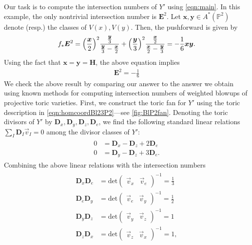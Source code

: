 \documentclass[11pt,oneside,english]{article}
\numberwithin{equation}{section}
\let\originalleft\left
\let\originalright\right
\renewcommand*{\left}{\mathopen{}\mathclose\bgroup\originalleft}
\renewcommand*{\right}{\aftergroup\egroup\originalright}
\theoremstyle{definition}
\begin{document}
Our task is to compute the intersection numbers of $Y'$ using \cref{eqn:main}. In this example, the only nontrivial intersection number is $\boldsymbol{E}^2$. Let $\boldsymbol{x}, \boldsymbol{y} \in A^*(\mathbb P^2)$ denote (resp.) the classes of $V(x),V(y)$. Then, the pushforward is given by 
	\begin{align}
		f_{*} \boldsymbol E^2 = \left( \frac{\boldsymbol{x}}{2} \right)^2  \frac{\frac{\boldsymbol{y}}{3}}{\frac{\boldsymbol{y}}{3} - \frac{\boldsymbol{x}}{2}} +  \left( \frac{\boldsymbol{y}}{3} \right)^2  \frac{\frac{\boldsymbol{x}}{2} }{\frac{\boldsymbol{x}}{2} - \frac{\boldsymbol{y}}{3} } = - \frac{1}{6} \boldsymbol{x}  \boldsymbol{y}.
	\end{align}
Using the fact that $\boldsymbol{x} = \boldsymbol{y} = \boldsymbol{H}$, the above equation implies
	\begin{align}
	\label{eqn:E2BlP2}
		\boldsymbol{E}^2 =- \frac{1}{6} 
	\end{align}
We check the above result by comparing our answer to the answer we obtain using known methods for computing intersection numbers of weighted blowups of projective toric varieties. First, we construct the toric fan for $Y'$ using the toric description in \cref{eqn:homcoordBl23P2}---see \cref{fig:BlP2fan}. Denoting the toric divisors of $Y'$ by $\boldsymbol{D}_{x}, \boldsymbol D_y, \boldsymbol D_z, \boldsymbol D_e$, we find the following standard linear relations $\sum_I \boldsymbol{D}_I \vec v_{I} =0$ among the divisor classes of $Y'$:
	\begin{align}
	\begin{split}
		0&=\boldsymbol{D}_x -\boldsymbol{D}_z + 2 \boldsymbol{D}_e\\
		0 &= \boldsymbol{D}_y - \boldsymbol{D}_z + 3 \boldsymbol{D}_e.
	\end{split}
	\end{align}
Combining the above linear relations with the intersection numbers
	\begin{align}
	\begin{split}
		\boldsymbol{D}_x  \boldsymbol{D}_e &= \text{det}\begin{pmatrix} \vec v_x & \vec v_e\end{pmatrix}^{-1} = \frac{1}{3}\\
		\boldsymbol{D}_e  \boldsymbol{D}_y &= \text{det}\begin{pmatrix} \vec v_e & \vec v_y\end{pmatrix}^{-1} = \frac{1}{2}\\
		\boldsymbol{D}_y  \boldsymbol{D}_z &= \text{det}\begin{pmatrix} \vec v_y & \vec v_z\end{pmatrix}^{-1} = 1 \\
		\boldsymbol{D}_z \boldsymbol{D}_x &= \text{det}\begin{pmatrix} \vec v_z & \vec v_x\end{pmatrix}^{-1} = 1,
	\end{split}
	\end{align}
\end{document}
